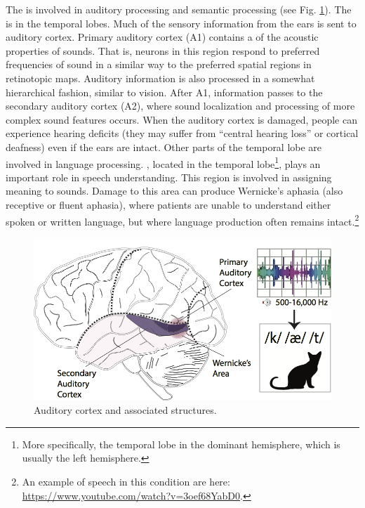 The  is involved in auditory processing and semantic processing (see Fig. \ref{brain_audition}). The  is in the temporal lobes. Much of the sensory information from the ears is sent to auditory cortex. Primary auditory cortex (A1) contains a  of the acoustic properties of sounds. That is, neurons in this region respond to preferred frequencies of sound in a similar way to the preferred spatial regions in retinotopic maps. Auditory information is also processed in a somewhat hierarchical fashion, similar to vision. After A1, information passes to the secondary auditory cortex (A2), where sound localization and processing of more complex sound features occurs. When the auditory cortex is damaged, people can experience hearing deficits (they may suffer from ``central hearing loss'' or cortical deafness) even if the ears are intact. Other parts of the temporal lobe are involved in language processing. , located in the temporal lobe\footnote{More specifically, the temporal lobe in the dominant hemisphere, which is usually the left hemisphere.}, plays an important role in speech understanding. This region is involved in assigning meaning to sounds. Damage to this area can produce Wernicke's aphasia (also receptive or fluent aphasia), where patients are unable to understand either spoken or written language, but where language production often remains intact.\footnote{An example of speech in this condition are here: \url{https://www.youtube.com/watch?v=3oef68YabD0}.}

\begin{figure}[h]
\centering
\includegraphics[scale=.7]{./images/brain_audition.png}
\caption[Pamela Payne.]{Auditory cortex and associated structures.}
\label{brain_audition}
\end{figure}

